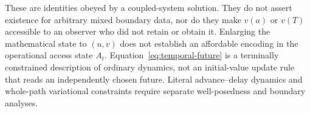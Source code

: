These are identities obeyed by a coupled-system solution. They do not
assert existence for arbitrary mixed boundary data, nor do they make
$v(a)$ or $v(T)$ accessible to an observer who did not retain or obtain
it. Enlarging the mathematical state to $(u,v)$ does not establish an
affordable encoding in the operational access state $A_t$.
Equation~\eqref{eq:temporal-future} is a terminally constrained
description of ordinary dynamics, not an initial-value update rule that
reads an independently chosen future. Literal advance--delay dynamics
and whole-path variational constraints require separate well-posedness
and boundary analyses.



